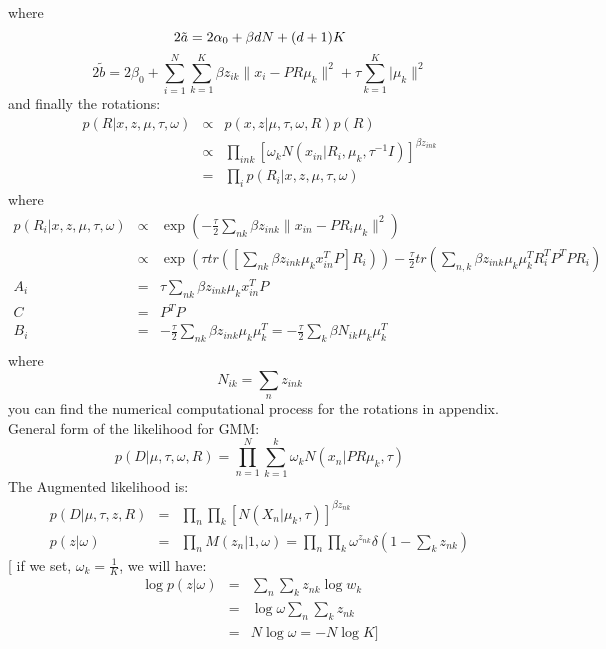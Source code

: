 \documentclass[11pt]{article}
\begin{document}
where
\begin{equation*}
2\tilde{a}=2\alpha_0+\beta dN+(d+1)K \\
\end{equation*}
\begin{equation*}
2\tilde{b}=2\beta_0+\sum_{i=1}^N\sum_{k=1}^K \beta z_{ik}\|x_i-PR\mu_k\|^2+\tau\sum_{k=1}^K|\mu_k\|^2
\end{equation*}
and finally the rotations:
\begin{eqnarray*}
p(R|x,z,\mu,\tau,\omega) &\propto & p(x,z|\mu,\tau,\omega,R)p(R)\\
&\propto & \prod_{ink}[\omega_kN(x_{in}|R_i,\mu_k,\tau^{-1}I)]^{\beta z_{ink}}\\
&=& \prod_{i}p(R_i|x,z,\mu,\tau,\omega)
\end{eqnarray*}
where
\begin{eqnarray*}
p(R_i|x,z,\mu,\tau,\omega) &\propto & \exp(-\frac{\tau}{2}\sum_{nk} \beta z_{ink}\|x_{in}-PR_i\mu_k\|^2)\\
& \propto & \exp(\tau tr([\sum_{nk}\beta z_{ink}\mu_kx_{in}^TP]R_i))-\frac{\tau}{2}tr(\sum_{n,k} \beta z_{ink}\mu_k\mu_k^TR_i^TP^TPR_i)\\
A_i&=& \tau\sum_{nk}\beta z_{ink}\mu_kx_{in}^TP\\%
C &=& P^TP\\
B_i &=& -\frac{\tau}{2}\sum_{nk}\beta z_{ink}\mu_k\mu_k^T=-\frac{\tau}{2}\sum_{k}\beta N_{ik}\mu_k\mu_k^T\\
\end{eqnarray*}
where
\begin{equation*}
 N_{ik}=\sum_nz_{ink}
\end{equation*}
you can find the numerical computational process for the rotations in appendix. \\
General form of the likelihood for GMM:
\begin{equation*}
p(D|\mu,\tau,\omega,R) = \prod_{n=1}^N\sum_{k=1}^k\omega_kN(x_n|PR\mu_k,\tau)
\end{equation*}
The Augmented likelihood is:
\begin{eqnarray*}
p(D|\mu,\tau,z,R) &=& \prod_n\prod_k[N(X_n|\mu_k,\tau)]^{\beta z_{nk}}\\
p(z|\omega) &=& \prod_nM(z_n|1,\omega)=\prod_n\prod_k\omega^{z_{nk}}\delta(1-\sum_kz_{nk})
\end{eqnarray*}
 [ if we set, $\omega_k=\frac{1}{K} $, \quad we will have:
\begin{eqnarray*}
\log{p(z|\omega)}&=&\sum_n\sum_kz_{nk}\log{w_k} \\
&=&\log{\omega}\sum_n\sum_kz_{nk} \\
&=&N\log{\omega}=-N\log{K}]
\end{eqnarray*}  
\end{document}
